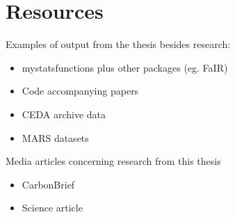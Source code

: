\chapter{\label{resources}Resources}

Examples of output from the thesis besides research:
\begin{itemize}
    \item mystatsfunctions plus other packages (eg. FaIR)
    \item Code accompanying papers
    \item CEDA archive data
    \item MARS datasets
\end{itemize}

Media articles concerning research from this thesis
\begin{itemize}
    \item CarbonBrief
    \item Science article
\end{itemize}